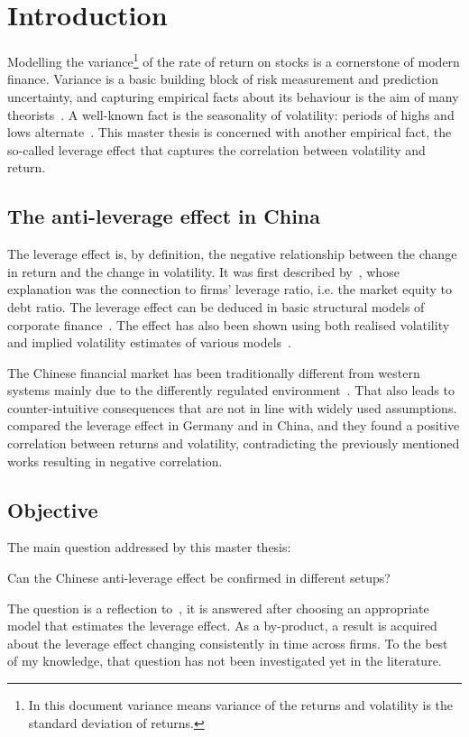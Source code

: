 \section{Introduction}

Modelling the variance\footnote{In this document variance means variance of the returns and volatility is the standard deviation of returns.} of the rate of return on stocks is a cornerstone of modern finance.
Variance is a basic building block of risk measurement and prediction uncertainty, and capturing empirical facts about its behaviour is the aim of many theorists~\citep{Christie1982}.
A well-known fact is the seasonality of volatility: periods of highs and lows alternate~\citep{schwert1989why}.
This master thesis is concerned with another empirical fact, the so-called leverage effect that captures the correlation between volatility and return.

\subsection{The anti-leverage effect in China}

The leverage effect is, by definition, the negative relationship between the change in return and the change in volatility.
It was first described by~\citet{black1976studies}, whose explanation was the connection to firms' leverage ratio, i.e. the market equity to debt ratio.
The leverage effect can be deduced in basic structural models of corporate finance~\citep{Christie1982}.
The effect has also been shown using both realised volatility and implied volatility estimates of various models~\citep{Bouchaud2001,Harvey1996,Christie1982,french1987expected}.

The Chinese financial market has been traditionally different from western systems mainly due to the differently regulated environment~\citep{GORDON2003}.
That also leads to counter-intuitive consequences that are not in line with widely used assumptions.
\citet{Shen2009} compared the leverage effect in Germany and in China, and they found a positive correlation between returns and volatility, contradicting the previously mentioned works resulting in negative correlation.


\subsection{Objective}

The main question addressed by this master thesis:
\begin{center}
	Can the Chinese anti-leverage effect be confirmed in different setups?
\end{center}
The question is a reflection to~\citet{Shen2009}, it is answered after choosing an appropriate model that estimates the leverage effect.
As a by-product, a result is acquired about the leverage effect changing consistently in time across firms.
To the best of my knowledge, that question has not been investigated yet in the literature.

